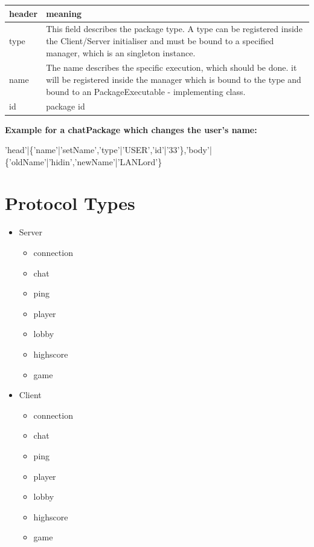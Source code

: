 \documentclass{scrartcl}
\begin{document}
\begin{center}
    \begin{tabular}{| p{2cm} | p{10cm} |}
    \hline
    header & meaning \\ \hline

    type &  This field describes the package type. A type can be registered inside the Client/Server initialiser and must be bound to a specified manager, which is an singleton instance.\\ \hline

    name & The name describes the specific execution,
    which should be done. it will be registered inside the manager which is bound to the type and bound to an PackageExecutable - implementing class. \\ \hline

    id &  package id\\ \hline

    \end{tabular}

\end{center}
\textbf{Example for a chatPackage which changes the user's name:}
\begin{center}
    'head'|\{'name'|'setName','type'|'USER','id'|'33'\},'body'|\{'oldName'|'hidin','newName'|'LANLord'\}
\end{center}


\pagebreak
\section{Protocol Types}
\begin{itemize}
    \item Server
    \begin{itemize}
        \item connection
        \item chat
        \item ping
        \item player
        \item lobby
        \item highscore
        \item game
    \end{itemize}
    \item Client
    \begin{itemize}
        \item connection
        \item chat
        \item ping
        \item player
        \item lobby
        \item highscore
        \item game
    \end{itemize}
\end{itemize}
\end{document}
